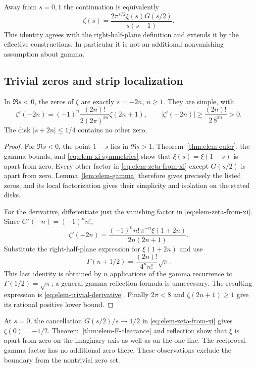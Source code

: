 Away from $s=0,1$ the continuation is equivalently
\begin{equation}
 \zeta(s)=\frac{2\pi^{s/2}\xi(s)G(s/2)}{s(s-1)}.
 \label{eq:elem-zeta-from-xi}
\end{equation}
This identity agrees with the right-half-plane definition and extends
it by the effective constructions.  In particular it is not an
additional nonvanishing assumption about gamma.

\subsection{Trivial zeros and strip localization}

\begin{theorem}
\label{thm:elem-trivial}
In $\Re s<0$, the zeros of $\zeta$ are exactly $s=-2n$, $n\ge1$.
They are simple, with
\begin{equation}
 \zeta'(-2n)=(-1)^n
 \frac{(2n)!}{2(2\pi)^{2n}}\zeta(2n+1),\qquad
 |\zeta'(-2n)|\ge\frac{(2n)!}{2\,8^{2n}}>0.
 \label{eq:elem-trivial-derivative}
\end{equation}
The disk $|s+2n|\le1/4$ contains no other zero.
\end{theorem}

\begin{proof}
For $\Re s<0$, the point $1-s$ lies in $\Re s>1$.
Theorem~\ref{thm:elem-euler}, the gamma bounds, and
\eqref{eq:elem-xi-symmetries} show that $\xi(s)=\xi(1-s)$ is apart
from zero.  Every other factor in \eqref{eq:elem-zeta-from-xi} except
$G(s/2)$ is apart from zero.  Lemma~\ref{lem:elem-gamma} therefore
gives precisely the listed zeros, and its local factorization gives
their simplicity and isolation on the stated disks.

For the derivative, differentiate just the vanishing factor in
\eqref{eq:elem-zeta-from-xi}.  Since $G'(-n)=(-1)^n n!$,
\[
 \zeta'(-2n)
 =\frac{(-1)^n n!\,\pi^{-n}\xi(1+2n)}{2n(2n+1)}.
\]
Substitute the right-half-plane expression for $\xi(1+2n)$ and use
\[
 \Gamma(n+1/2)=\frac{(2n)!}{4^n n!}\sqrt\pi.
\]
This last identity is obtained by $n$ applications of the gamma
recurrence to $\Gamma(1/2)=\sqrt\pi$; a general gamma reflection
formula is unnecessary.  The resulting expression is
\eqref{eq:elem-trivial-derivative}.  Finally $2\pi<8$ and
$\zeta(2n+1)\ge1$ give its rational positive lower bound.
\end{proof}

At $s=0$, the cancellation $G(s/2)/s\longrightarrow1/2$ in
\eqref{eq:elem-zeta-from-xi} gives $\zeta(0)=-1/2$.
Theorem~\ref{thm:elem-F-clearance} and reflection show that $\xi$ is
apart from zero on the imaginary axis as well as on the one-line.
The reciprocal gamma factor has no additional zero there.  These
observations exclude the boundary from the nontrivial zero set.

